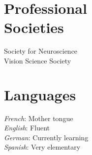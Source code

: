 \documentclass[margin,line]{resume}
\begin{document}
\begin{resume}
%
%
%

	
	\vspace{3mm}
	\section{\mysidestyle Professional\\Societies}
	Society for Neuroscience\\
	Vision Science Society
	
	
	\vspace{3mm}
    \section{\mysidestyle Languages}
	\textsl{French}: Mother tongue\\
	\textsl{English}: Fluent\\
	\textsl{German}: Currently learning\\
	\textsl{Spanish}: Very elementary

\newpage	

	\vspace{3mm}

\end{resume}
\end{document}

